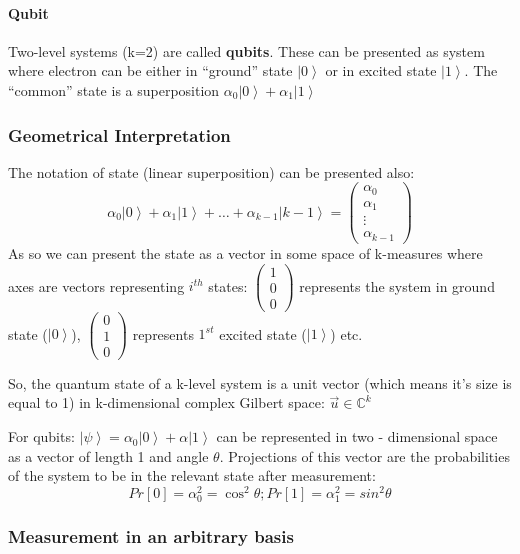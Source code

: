 \documentclass{scrartcl}
\newcommand{\cplx}{\mathbb{C}} %
\newcommand{\ket}[1]{\left| #1 \right>} %
\begin{document}
\paragraph{Qubit}

Two-level systems (k=2) are called {\bf qubits}. These can be presented as
system where electron can be either in ``ground'' state $\ket0$ or in excited
state $\ket1$. The ``common'' state is a superposition $\alpha_0 \ket0 +
\alpha_1 \ket1$

\subsubsection{Geometrical Interpretation}
\label{sec:2-2}

The notation of state (linear superposition) can be presented also:
\[\alpha_0 \ket0 + \alpha_1 \ket1 + \dots +
\alpha_{k-1} \ket{k-1} = \begin{pmatrix} \alpha_0 \\ \alpha_1 \\ \vdots \\
  \alpha_{k-1} \end{pmatrix}\] As so we can present the state as a vector in
some space of k-measures where axes are vectors representing $i^{th}$ states:
$\begin{pmatrix} 1 \\ 0 \\ 0 \end{pmatrix}$ represents the system in ground
state ($\ket0$), $\begin{pmatrix} 0 \\ 1 \\ 0 \end{pmatrix}$ represents $1^{st}$
excited state ($\ket1$) etc.

So, the quantum state of a k-level system is a unit vector (which means it's
size is equal to 1) in k-dimensional complex Gilbert space: $\vec u \in
\cplx^k$

For qubits: $\ket\psi = \alpha_0 \ket0 + \alpha \ket1$ can be represented in two
- dimensional space as a vector of length 1 and angle $\theta$. Projections of
this vector are the probabilities of the system to be in the relevant state
after measurement:
\[ Pr[0] = \alpha_0^2 = \cos^2 \theta; Pr[1] = \alpha_1^2 = sin^2 \theta\]

\subsubsection{Measurement in an arbitrary basis}
\label{sec:2-3}
\end{document}
